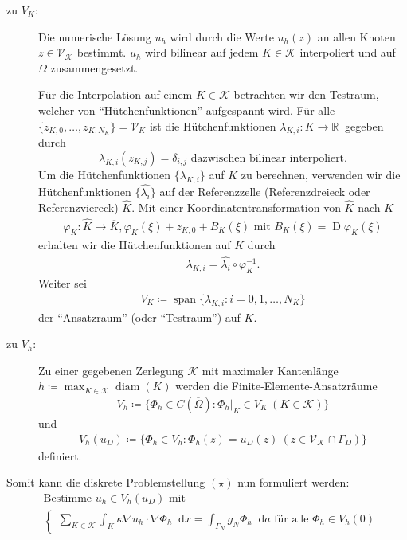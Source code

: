 \documentclass[12pt,a4paper]{scrartcl}
\newcommand{\R}{\mathbb{R}}
\newcommand*\diff{\mathop{}\!\mathrm{d}}
\DeclareMathOperator{\spann}{span}
\DeclareMathOperator{\Jacobi}{D}
\DeclareMathOperator{\diam}{diam}
\newcommand{\defi}[1]{\textcolor{Mygreen}{#1}}
\renewcommand{\phi}{\varphi}
\numberwithin{equation}{section}
\begin{document}
\begin{enumerate}[label=(\roman*)]
\begin{description}
	\item[zu $V_K$:] 
	Die numerische Lösung $u_h$ wird durch die Werte $ u_h(z) $ an allen Knoten $z \in \mathcal{V}_\mathcal{K}$ bestimmt. $ u_h $ wird bilinear auf jedem $K \in \mathcal{K}$ interpoliert und auf $ \Omega $ zusammengesetzt.
	
	Für die Interpolation auf einem $ K \in \mathcal{K} $ betrachten wir den Testraum, welcher von \enquote{Hütchenfunktionen} aufgespannt wird. Für alle $ \{z_{K,0},\dots, z_{K,N_K} \} = \mathcal{V}_K $ ist die Hütchenfunktionen $ \lambda_{K,i}\colon K \to \R \ $ gegeben durch
		\[
			\lambda_{K,i}(z_{K,j}) = \delta_{i,j}
			\text{ dazwischen bilinear interpoliert.}
		\] 
		Um die Hütchenfunktionen $ \{\lambda_{K,i}\} $ auf $ K $ zu berechnen, verwenden wir die Hütchenfunktionen $ \{\hat{\lambda_i}\} $ auf der \defi{Referenzzelle} (Referenzdreieck oder Referenzviereck) $ \hat{K} $. Mit einer Koordinatentransformation von $ \hat{K} $ nach $ K $
		\begin{align*}
			\phi_K\colon \hat{K} \to \overline{K}, \phi_K(\xi) + z_{K,0} + B_K(\xi) \text{ mit } B_K(\xi) = \Jacobi\phi_K(\xi)
		\end{align*}
		erhalten wir die Hütchenfunktionen auf $ K $ durch
		\begin{align*}
			\lambda_{K,i} = \hat{\lambda_i} \circ \phi_K^{-1}.
		\end{align*}
		Weiter sei
		\begin{align*}
			V_K \coloneqq \spann\{\lambda_{K,i}: i=0,1,\dots,N_K\}
		\end{align*}
		der \enquote{Ansatzraum} (oder \enquote{Testraum}) auf $ K $. 
	
\item[zu $ V_h $:] Zu einer gegebenen Zerlegung $\mathcal{K}$ mit \defi{maximaler Kantenlänge} $ h \coloneqq \max_{K \in \mathcal{K}} \diam(K) $ werden die \defi{Finite-Elemente-Ansatzräume} 
	\begin{align*}
		V_h \coloneqq \{ \Phi_h \in C(\overline{\Omega}): \Phi_h|_K \in V_K \ (K \in \mathcal{K})\}
	\end{align*}
	und
	\begin{align*}
		V_h(u_D) \coloneqq \{ \Phi_h \in V_h: \Phi_h(z)=u_D(z) \ (z \in \mathcal{V}_\mathcal{K} \cap \Gamma_D) \}
	\end{align*}
	definiert.
	
\end{description}

Somit kann die diskrete Problemstellung $ (\star) $ nun  formuliert werden:
	\begin{align*}
		&\text{Bestimme } u_h \in V_h(u_D) \text{ mit }\\
		&\begin{cases}
		\sum_{K \in \mathcal{K}} \int_{K} \kappa \nabla u_h \cdot \nabla \Phi_h \diff x = \int_{\Gamma_N} g_N  \Phi_h \diff a \text{ für alle } \Phi_h \in V_h(0)
		\end{cases}
	\end{align*}


\end{enumerate}
\end{document}
